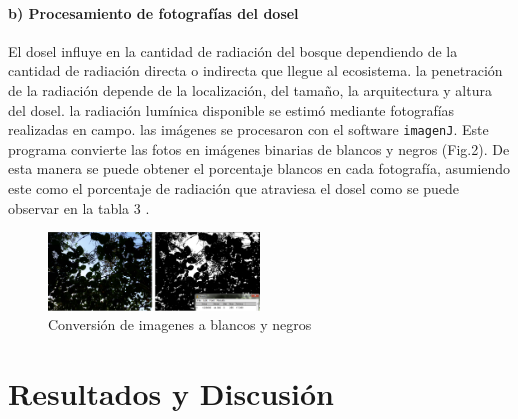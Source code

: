 \documentclass[letterpaper,9pt,twocolumn,twoside,]{pinp}
\begin{document}
\hypertarget{b-procesamiento-de-fotografuxedas-del-dosel}{%
\paragraph{b) Procesamiento de fotografías del
dosel}\label{b-procesamiento-de-fotografuxedas-del-dosel}}

El dosel influye en la cantidad de radiación del bosque dependiendo de
la cantidad de radiación directa o indirecta que llegue al ecosistema.
la penetración de la radiación depende de la localización, del tamaño,
la arquitectura y altura del dosel. la radiación lumínica disponible se
estimó mediante fotografías realizadas en campo. las imágenes se
procesaron con el software \texttt{imagenJ}. Este programa convierte las
fotos en imágenes binarias de blancos y negros (Fig.2). De esta manera
se puede obtener el porcentaje blancos en cada fotografía, asumiendo
este como el porcentaje de radiación que atraviesa el dosel como se
puede observar en la tabla 3 .

\begin{figure}[h]
  \centering
  \includegraphics[width= 0.5\textwidth]{ima2.png}
  \caption{Conversión de imagenes a blancos y negros}
\end{figure}

\hypertarget{resultados-y-discusiuxf3n}{%
\section{Resultados y Discusión}\label{resultados-y-discusiuxf3n}}
\end{document}
